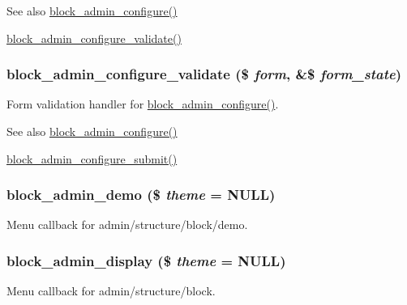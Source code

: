 \begin{DoxySeeAlso}{See also}
\hyperlink{group__forms_ga0efaf6e043d69e3fe4f596341f6f90e2}{block\_\-admin\_\-configure()} 

\hyperlink{block_8admin_8inc_a5c45bd363e4fcbacea89a31e60215b47}{block\_\-admin\_\-configure\_\-validate()} 
\end{DoxySeeAlso}
\hypertarget{block_8admin_8inc_a5c45bd363e4fcbacea89a31e60215b47}{
\subsubsection[{block\_\-admin\_\-configure\_\-validate}]{\setlength{\rightskip}{0pt plus 5cm}block\_\-admin\_\-configure\_\-validate (\$ {\em form}, \/  \&\$ {\em form\_\-state})}}
\label{block_8admin_8inc_a5c45bd363e4fcbacea89a31e60215b47}
Form validation handler for \hyperlink{group__forms_ga0efaf6e043d69e3fe4f596341f6f90e2}{block\_\-admin\_\-configure()}.

\begin{DoxySeeAlso}{See also}
\hyperlink{group__forms_ga0efaf6e043d69e3fe4f596341f6f90e2}{block\_\-admin\_\-configure()} 

\hyperlink{block_8admin_8inc_a5f23480eb6a76d82ab516f09baaa2318}{block\_\-admin\_\-configure\_\-submit()} 
\end{DoxySeeAlso}
\hypertarget{block_8admin_8inc_ab310f1c23a7db66b3f6b3be6d57abbec}{
\subsubsection[{block\_\-admin\_\-demo}]{\setlength{\rightskip}{0pt plus 5cm}block\_\-admin\_\-demo (\$ {\em theme} = {\ttfamily NULL})}}
\label{block_8admin_8inc_ab310f1c23a7db66b3f6b3be6d57abbec}
Menu callback for admin/structure/block/demo. \hypertarget{block_8admin_8inc_a46d186397b98e4faf46681f7f9cd86a1}{
\subsubsection[{block\_\-admin\_\-display}]{\setlength{\rightskip}{0pt plus 5cm}block\_\-admin\_\-display (\$ {\em theme} = {\ttfamily NULL})}}
\label{block_8admin_8inc_a46d186397b98e4faf46681f7f9cd86a1}
Menu callback for admin/structure/block.


